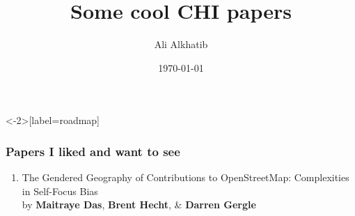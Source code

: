 \documentclass[aspectratio=169,12pt,noslidenumbers]{beamer} %
\title{Some cool CHI papers}
\author{Ali Alkhatib} %
\institute[Stanford]{Stanford University}
\date{\today}
\newcommand{\onlyinsubfile}[1]{#1}
\newcommand{\notinsubfile}[1]{}
\begin{document}
\renewcommand{\onlyinsubfile}[1]{}
\renewcommand{\notinsubfile}[1]{#1}


\begin{frame}
\titlepage
\end{frame} 



\begin{frame}<-2>[label=roadmap]\frametitle{Papers I liked and want to see}

\begin{enumerate}
  
  
  
  
  
  \item<1,2>
  The Gendered Geography of Contributions to OpenStreetMap: Complexities in Self-Focus Bias
  {\\\scriptsize by \textbf{Maitraye Das}, \textbf{Brent Hecht}, \& \textbf{Darren Gergle}}
  

\end{enumerate}
\end{frame}
\end{document}

